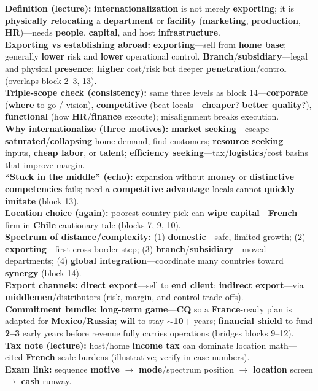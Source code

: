 \documentclass[10pt,a4paper]{article}
\begin{document}
{
\textbf{Definition (lecture):} \textbf{internationalization} is not merely \textbf{exporting}; it is \textbf{physically relocating} a \textbf{department} or \textbf{facility} (\textbf{marketing}, \textbf{production}, \textbf{HR})---needs \textbf{people}, \textbf{capital}, and host \textbf{infrastructure}.\\
\textbf{Exporting vs establishing abroad:} \textbf{exporting}---sell from \textbf{home base}; generally \textbf{lower} risk and \textbf{lower} operational control. \textbf{Branch}/\textbf{subsidiary}---legal and physical \textbf{presence}; \textbf{higher} cost/risk but deeper \textbf{penetration}/control (overlaps block 2--3, 13).\\
\textbf{Triple-scope check (consistency):} same three levels as block 14---\textbf{corporate} (\textbf{where} to go / vision), \textbf{competitive} (beat locals---\textbf{cheaper}? \textbf{better quality}?), \textbf{functional} (how \textbf{HR}/\textbf{finance} execute); misalignment breaks execution.\\
\textbf{Why internationalize (three motives):} \textbf{market seeking}---escape \textbf{saturated}/\textbf{collapsing} home demand, find customers; \textbf{resource seeking}---inputs, \textbf{cheap labor}, or \textbf{talent}; \textbf{efficiency seeking}---tax/\textbf{logistics}/cost basins that improve margin.\\
\textbf{``Stuck in the middle'' (echo):} expansion without \textbf{money} or \textbf{distinctive competencies} fails; need a \textbf{competitive advantage} locals cannot \textbf{quickly imitate} (block 13).\\
\textbf{Location choice (again):} poorest country pick can \textbf{wipe capital}---\textbf{French} firm in \textbf{Chile} cautionary tale (blocks 7, 9, 10).\\
\textbf{Spectrum of distance/complexity:} (1) \textbf{domestic}---safe, limited growth; (2) \textbf{exporting}---first cross-border step; (3) \textbf{branch}/\textbf{subsidiary}---moved departments; (4) \textbf{global integration}---coordinate many countries toward \textbf{synergy} (block 14).\\
\textbf{Export channels:} \textbf{direct export}---sell to \textbf{end client}; \textbf{indirect export}---via \textbf{middlemen}/distributors (risk, margin, and control trade-offs).\\
\textbf{Commitment bundle:} \textbf{long-term game}---\textbf{CQ} so a \textbf{France}-ready plan is adapted for \textbf{Mexico}/\textbf{Russia}; \textbf{will} to stay $\sim$\textbf{10+} years; \textbf{financial shield} to fund \textbf{2--3} early years before revenue fully carries operations (bridges blocks 9--12).\\
\textbf{Tax note (lecture):} host/home \textbf{income tax} can dominate location math---cited \textbf{French}-scale burdens (illustrative; verify in case numbers).\\
\textbf{Exam link:} sequence \textbf{motive} $\rightarrow$ \textbf{mode}/spectrum position $\rightarrow$ \textbf{location} screen $\rightarrow$ \textbf{cash} runway.
}
\end{document}
